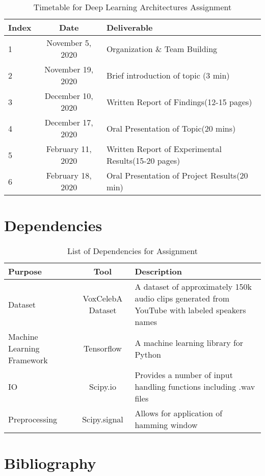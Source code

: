\documentclass[12pt]{article}
\begin{document}
\begin{table}[h!]
	\begin{center}
		\caption{Timetable for Deep Learning Architectures Assignment}
		\label{tab:table1}
		\begin{tabular}{l|c|l}
			\textbf{Index} & \textbf{Date} & \textbf{Deliverable} \\
			\hline
			1 & November 5, 2020 & Organization \& Team Building\\
			2 & November 19, 2020 & Brief introduction of topic (3 min)\\
			3 & December 10, 2020 & Written Report of Findings(12-15 pages)\\
			4 & December 17, 2020 & Oral Presentation of Topic(20 mins)\\
			5 & February 11, 2020 & Written Report of Experimental Results(15-20 pages)\\
			6 & February 18, 2020 & Oral Presentation of Project Results(20 min)\\
			\end{tabular}
		\end{center}
	\end{table}

\section{Dependencies}

\begin{table}[h!]
	\begin{center}
		\caption{List of Dependencies for Assignment}
		\label{tab:table1}
		\begin{tabular}{l|c|l}
			\textbf{Purpose} & \textbf{Tool} & \textbf{Description} \\
			\hline
			Dataset & VoxCelebA Dataset & A dataset of approximately 150k audio clips generated from YouTube with labeled speakers names\\
			Machine Learning Framework &  Tensorflow & A machine learning library for Python\\
			IO & Scipy.io & Provides a number of input handling functions including .wav files \\
			Preprocessing & Scipy.signal & Allows for application of hamming window\\
			\end{tabular}
		\end{center}
	\end{table}

\section{Bibliography}
\end{document}
